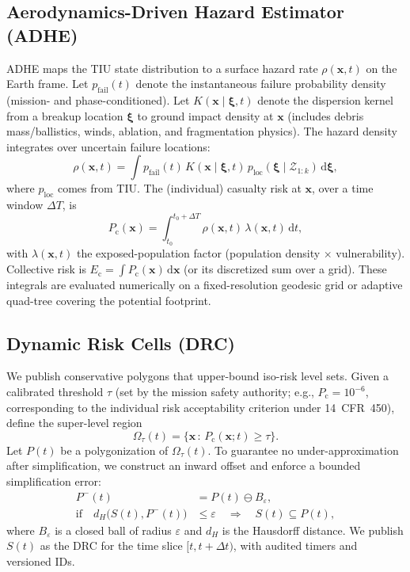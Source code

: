 \documentclass[journal]{new-aiaa}
\newcommand{\Pc}{\ensuremath{P_\mathrm{c}}}
\newcommand{\Ec}{\ensuremath{E_\mathrm{c}}}
\begin{document}
\subsection{Aerodynamics-Driven Hazard Estimator (ADHE)}
ADHE maps the TIU state distribution to a surface hazard rate $\rho(\mathbf{x},t)$ on the Earth frame. Let $p_\mathrm{fail}(t)$ denote the instantaneous failure probability density (mission- and phase-conditioned). Let $K(\mathbf{x}\mid \boldsymbol{\xi}, t)$ denote the dispersion kernel from a breakup location $\boldsymbol{\xi}$ to ground impact density at $\mathbf{x}$ (includes debris mass/ballistics, winds, ablation, and fragmentation physics). The hazard density integrates over uncertain failure locations:
\begin{equation}
    \rho(\mathbf{x},t) = \int p_\mathrm{fail}(t)\, K\!\left(\mathbf{x}\mid \boldsymbol{\xi}, t\right)\, p_\mathrm{loc}\!\left(\boldsymbol{\xi}\mid \mathcal{Z}_{1:k}\right)\, \mathrm{d}\boldsymbol{\xi},
\end{equation}
where $p_\mathrm{loc}$ comes from TIU. The (individual) casualty risk at $\mathbf{x}$, over a time window $\Delta T$, is
\begin{equation}
    \Pc(\mathbf{x}) = \int_{t_0}^{t_0+\Delta T} \rho(\mathbf{x},t)\, \lambda(\mathbf{x},t)\,\mathrm{d}t,
\end{equation}
with $\lambda(\mathbf{x},t)$ the exposed-population factor (population density $\times$ vulnerability). Collective risk is $ \Ec = \int \Pc(\mathbf{x})\,\mathrm{d}\mathbf{x}$ (or its discretized sum over a grid). These integrals are evaluated numerically on a fixed-resolution geodesic grid or adaptive quad-tree covering the potential footprint.

\subsection{Dynamic Risk Cells (DRC)}
We publish conservative polygons that upper-bound iso-risk level sets. Given a calibrated threshold $\tau$ (set by the mission safety authority; e.g., $\Pc=10^{-6}$, corresponding to the individual risk acceptability criterion under 14~CFR~450\cite{CFR450}), define the super-level region
\begin{equation}
    \Omega_\tau(t) = \bigl\{ \mathbf{x} \,:\, \Pc(\mathbf{x}; t) \ge \tau \bigr\}.
\end{equation}
Let $P(t)$ be a polygonization of $\Omega_\tau(t)$. To guarantee no under-approximation after simplification, we construct an inward offset and enforce a bounded simplification error:
\begin{align}
    P^-(t) &= P(t) \ominus B_\varepsilon, \\
    \text{if}\quad d_H\!\bigl(S(t), P^-(t)\bigr) &\le \varepsilon \quad \Rightarrow \quad S(t) \subseteq P(t),
\end{align}
where $B_\varepsilon$ is a closed ball of radius $\varepsilon$ and $d_H$ is the Hausdorff distance. We publish $S(t)$ as the DRC for the time slice $[t, t+\Delta t)$, with audited timers and versioned IDs.
\end{document}
